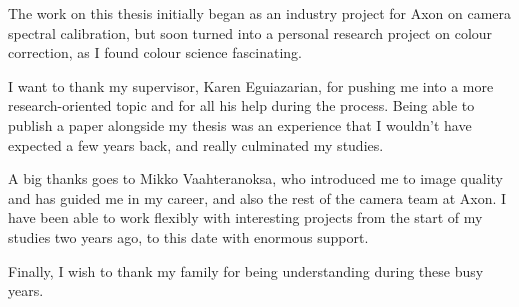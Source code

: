 The work on this thesis initially began as an industry project for Axon on camera spectral calibration, but soon turned into a personal research project on colour correction, as I found colour science fascinating.

I want to thank my supervisor, Karen Eguiazarian, for pushing me into a more research-oriented topic and for all his help during the process. Being able to publish a paper alongside my thesis was an experience that I wouldn't have expected a few years back, and really culminated my studies.

A big thanks goes to Mikko Vaahteranoksa, who introduced me to image quality and has guided me in my career, and also the rest of the camera team at Axon. I have been able to work flexibly with interesting projects from the start of my studies two years ago, to this date with enormous support.

Finally, I wish to thank my family for being understanding during these busy years.